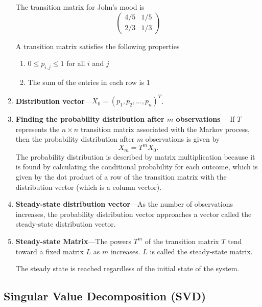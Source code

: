 \documentclass[letterpaper,12pt]{article}
\begin{document}
\begin{enumerate}
The transition matrix for John's mood is
\[
\left( \begin{array}{cc} 4/5 & 1/5 \\
2/3 & 1/3 \end{array} \right)
\]

A transition matrix satisfies the following properties

\begin{enumerate}

\item $0 \leq p_{i, j} \leq 1$ for all $i$ and $j$
\item The sum of the entries in each row is 1
\end{enumerate}

\item \textbf{Distribution vector}---$X_0 = (p_1, p_2, ..., p_n)^T$.

\item \textbf{Finding the probability distribution after $m$ observations}---
If $T$ represents the $n \times n$ transition matrix associated with the Markov process, then the probability distribution after $m$ observations is given by
\[
X_m = T^m X_0.
\]
The probability distribution is described by matrix multiplication because it is found by calculating the conditional probability for each outcome, which is given by the dot product of a row of the transition matrix with the distribution vector (which is a column vector). 

\item \textbf{Steady-state distribution vector}---As the number of observations increases, the probability distribution vector approaches a vector called the steady-state distribution vector. 

\item \textbf{Steady-state Matrix}---The powers $T^m$ of the transition matrix $T$ tend toward a fixed matrix $L$ as $m$ increases. $L$ is called the steady-state matrix. 

The steady state is reached regardless of the initial state of the system.

\end{enumerate}

\subsection{Singular Value Decomposition (SVD)}
\end{document}
